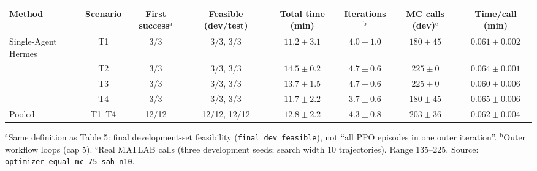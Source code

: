 \begin{tabular}{lccccccc}
\hline
Method & Scenario & First success$^{\mathrm{a}}$ & Feasible (dev/test) & Total time (min) & Iterations$^{\mathrm{b}}$ & MC calls (dev)$^{\mathrm{c}}$ & Time/call (min) \\
\hline
Single-Agent Hermes & T1 & 3/3 & 3/3, 3/3 & $11.2 \pm 3.1$ & $4.0 \pm 1.0$ & $180 \pm 45$ & $0.061 \pm 0.002$ \\
 & T2 & 3/3 & 3/3, 3/3 & $14.5 \pm 0.2$ & $4.7 \pm 0.6$ & $225 \pm 0$ & $0.064 \pm 0.001$ \\
 & T3 & 3/3 & 3/3, 3/3 & $13.7 \pm 1.5$ & $4.7 \pm 0.6$ & $225 \pm 0$ & $0.060 \pm 0.006$ \\
 & T4 & 3/3 & 3/3, 3/3 & $11.7 \pm 2.2$ & $3.7 \pm 0.6$ & $180 \pm 45$ & $0.065 \pm 0.006$ \\
\hline
Pooled & T1--T4 & 12/12 & 12/12, 12/12 & $12.8 \pm 2.2$ & $4.3 \pm 0.8$ & $203 \pm 36$ & $0.062 \pm 0.004$ \\
\hline
\end{tabular}

{\raggedright\footnotesize
$^{\mathrm{a}}$Same definition as Table 5: final development-set feasibility (\texttt{final\_dev\_feasible}), not ``all PPO episodes in one outer iteration''.
$^{\mathrm{b}}$Outer workflow loops (cap 5).
$^{\mathrm{c}}$Real MATLAB calls (three development seeds; search width 10 trajectories). Range 135--225. Source: \texttt{optimizer\_equal\_mc\_75\_sah\_n10}.
\par}
